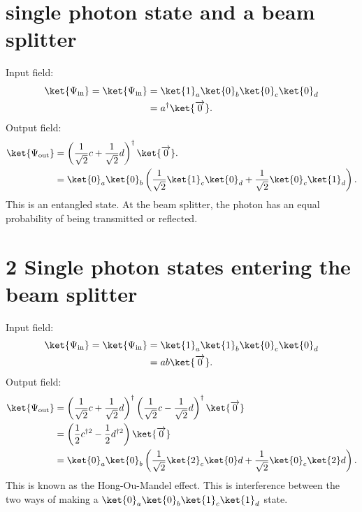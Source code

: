 \section{single photon state and a beam splitter}
Input field:
\begin{align}
\ket{\Psi_{\rm{in}}} = \ket{\Psi_{\rm{in}}} &= \ket{1}_a\ket{0}_b\ket{0}_c\ket{0}_d \\
 &= a^\dagger\ket{\overrightarrow{0}}.
\end{align}
Output field:
\begin{align}
\ket{\Psi_{\rm{out}}} &= \left(\frac{1}{\sqrt{2}}c + \frac{1}{\sqrt{2}}d\right)^\dagger\ket{\overrightarrow{0}}.\\
&= \ket{0}_a\ket{0}_b\left(\frac{1}{\sqrt{2}}\ket{1}_c\ket{0}_d + \frac{1}{\sqrt{2}}\ket{0}_c\ket{1}_d\right).
\end{align}
This is an entangled state. At the beam splitter, the photon has an equal probability of being transmitted or reflected.
\section{2 Single photon states entering the beam splitter}
Input field:
\begin{align}
\ket{\Psi_{\rm{in}}} = \ket{\Psi_{\rm{in}}} &= \ket{1}_a\ket{1}_b\ket{0}_c\ket{0}_d \\
&= ab\ket{\overrightarrow{0}}.
\end{align}
Output field:
\begin{align}
\ket{\Psi_{\rm{out}}} &=  \left( \frac{1}{\sqrt{2}}c + \frac{1}{\sqrt{2}}d\right)^\dagger\left( \frac{1}{\sqrt{2}}c - \frac{1}{\sqrt{2}}d\right)^\dagger\ket{\overrightarrow{0}}\\
&= \left( \frac{1}{2}c^{\dagger2} - \frac{1}{2}d^{\dagger2}\right)\ket{\overrightarrow{0}}\\
&= \ket{0}_a\ket{0}_b\left(\frac{1}{\sqrt{2}}\ket{2}_c\ket{0}d + \frac{1}{\sqrt{2}}\ket{0}_c\ket{2}d \right).
\end{align}
This is known as the Hong-Ou-Mandel effect. This is interference between the two ways of making a $\ket{0}_a\ket{0}_b\ket{1}_c\ket{1}_d$ state.
